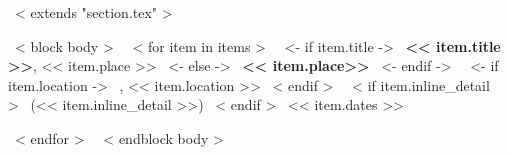 ~< extends "section.tex" >~

~< block body >~
    ~< for item in items >~
      ~<- if item.title ->~
      \textbf{<< item.title >>}, << item.place >>
      ~<- else ->~
      \textbf{<< item.place>>}
      ~<- endif ->~
      ~<- if item.location ->~
      , << item.location >>
      ~< endif >~
      ~< if item.inline_detail >~
        (<< item.inline_detail >>)
      ~< endif >~
      \hfill << item.dates >> \par
    ~< endfor >~
~< endblock body >~
